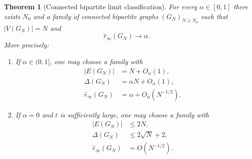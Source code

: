 \documentclass[11pt]{article}
\newcommand{\sri}{\hat r_{\infty}}
\newtheorem{theorem}{Theorem}[section]
\theoremstyle{definition}
\theoremstyle{remark}
\begin{document}
\begin{theorem}[Connected bipartite limit classification]\label{thm:connected-classification}
For every $\alpha\in[0,1]$ there exists $N_0$ and a family of connected bipartite graphs
$(G_N)_{N\ge N_0}$ such that $|V(G_N)|=N$ and
\[
\sri(G_N)\to \alpha.
\]
More precisely:
\begin{enumerate}[label={\rm (\roman*)}]
\item If $\alpha\in(0,1]$, one may choose a family with
\[
\begin{aligned}
|E(G_N)|&=N+O_{\alpha}(1),\\
\Delta(G_N)&=\alpha N+O_{\alpha}(1),\\
\sri(G_N)&=\alpha+O_{\alpha}(N^{-1/2}).
\end{aligned}
\]
\item If $\alpha=0$ and $t$ is sufficiently large, one may choose a family with
\[
\begin{aligned}
|E(G_N)|&\le 2N,\\
\Delta(G_N)&\le 2\sqrt N+2,\\
\sri(G_N)&=O(N^{-1/2}).
\end{aligned}
\]
\end{enumerate}
\end{theorem}
\end{document}
